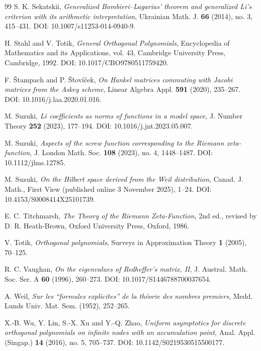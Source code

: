 \documentclass[preprint,12pt]{elsarticle}
\numberwithin{equation}{section}
\theoremstyle{plain}
\theoremstyle{definition}
\theoremstyle{remark}
\begin{document}
\begin{thebibliography}{99}
S. K. Sekatskii,
\emph{Generalized Bombieri--Lagarias' theorem and generalized Li's criterion with its arithmetic interpretation},
Ukrainian Math. J. \textbf{66} (2014), no. 3, 415--431.
DOI: 10.1007/s11253-014-0940-9.

H. Stahl and V. Totik,
\emph{General Orthogonal Polynomials},
Encyclopedia of Mathematics and its Applications, vol. 43,
Cambridge University Press, Cambridge, 1992.
DOI: 10.1017/CBO9780511759420.

F. \v{S}tampach and P. \v{S}\v{t}ov\'i\v{c}ek,
\emph{On Hankel matrices commuting with Jacobi matrices from the Askey scheme},
Linear Algebra Appl. \textbf{591} (2020), 235--267.
DOI: 10.1016/j.laa.2020.01.016.

M. Suzuki,
\emph{Li coefficients as norms of functions in a model space},
J. Number Theory \textbf{252} (2023), 177--194.
DOI: 10.1016/j.jnt.2023.05.007.

M. Suzuki,
\emph{Aspects of the screw function corresponding to the Riemann zeta-function},
J. London Math. Soc. \textbf{108} (2023), no. 4, 1448--1487.
DOI: 10.1112/jlms.12785.

M. Suzuki,
\emph{On the Hilbert space derived from the Weil distribution},
Canad. J. Math., First View (published online 3 November 2025), 1--24.
DOI: 10.4153/S0008414X25101739.

E. C. Titchmarsh,
\emph{The Theory of the Riemann Zeta-Function},
2nd ed., revised by D. R. Heath-Brown,
Oxford University Press, Oxford, 1986.

V. Totik,
\emph{Orthogonal polynomials},
Surveys in Approximation Theory \textbf{1} (2005), 70--125.

R. C. Vaughan,
\emph{On the eigenvalues of Redheffer's matrix, II},
J. Austral. Math. Soc. Ser. A \textbf{60} (1996), 260--273.
DOI: 10.1017/S1446788700037654.


A. Weil,
\emph{Sur les ``formules explicites'' de la th\'eorie des nombres premiers},
Medd. Lunds Univ. Mat. Sem. (1952), 252--265.

X.-B. Wu, Y. Lin, S.-X. Xu and Y.-Q. Zhao,
\emph{Uniform asymptotics for discrete orthogonal polynomials on infinite nodes with an accumulation point},
Anal. Appl. (Singap.) \textbf{14} (2016), no. 5, 705--737.
DOI: 10.1142/S0219530515500177.

\end{thebibliography}
\end{document}
